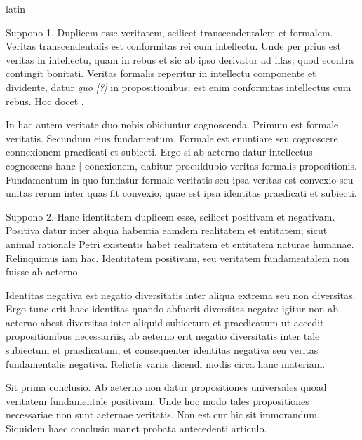 \begin{otherlanguage*}{latin}
        \pstart
        \pend
      
\pstart
  Suppono 1. Duplicem esse veritatem, scilicet transcendentalem et formalem. Veritas transcendentalis est conformitas rei cum intellectu. Unde per prius est veritas in intellectu, quam in rebus et sic ab ipso derivatur ad illas; quod econtra contingit bonitati. Veritas formalis reperitur in intellectu componente et dividente, datur \emph{quo [?]} in propositionibus; est enim conformitas intellectus cum rebus. Hoc docet . 
\pend

\pstart
  In hac autem veritate duo nobis obiciuntur cognoscenda. Primum est formale veritatis. Secundum eius fundamentum. Formale est enuntiare seu cognoscere connexionem praedicati et subiecti. Ergo si ab aeterno datur intellectus cognoscens hanc \textnormal{|}   conexionem, dabitur proculdubio veritas formalis propositionis. Fundamentum in quo fundatur formale veritatis seu ipsa veritas est convexio seu unitas rerum inter quas fit convexio, quae est ipsa identitas praedicati et subiecti. 
\pend

\pstart
  Suppono 2. Hanc identitatem duplicem esse, scilicet positivam et negativam. Positiva datur inter aliqua habentia eamdem realitatem et entitatem; sicut animal rationale Petri existentis habet realitatem et entitatem naturae humanae. Relinquimus iam hac. Identitatem positivam, seu veritatem fundamentalem non fuisse ab aeterno. 
\pend

\pstart
  Identitas negativa est negatio diversitatis inter aliqua extrema seu non diversitas. Ergo tunc erit haec identitas quando abfuerit diversitas negata: igitur non ab aeterno abest diversitas inter aliquid subiectum et praedicatum ut accedit propositionibus necessarriis, ab aeterno erit negatio diversitatis inter tale subiectum et praedicatum, et consequenter identitas negativa seu veritas fundamentalis negativa. Relictis variis dicendi modis circa hanc materiam. 
\pend

\pstart
  Sit prima conclusio. Ab aeterno non datur propositiones universales quoad veritatem fundamentale positivam. Unde hoc modo tales propositiones necessariae non sunt aeternae veritatis. Non est cur hic sit immorandum. Siquidem haec conclusio manet probata antecedenti articulo. 
\pend


\end{otherlanguage*}
